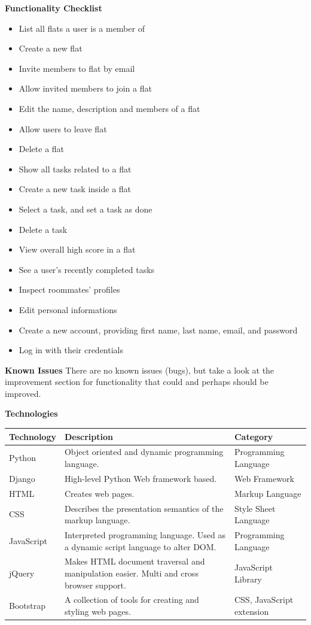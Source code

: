 \documentclass{sig-alt-release2}
\begin{document}
\textbf{Functionality Checklist}
\begin{itemize}
\item List all flats a user is a member of
\item Create a new flat
\item Invite members to flat by email
\item Allow invited members to join a flat 
\item Edit the name, description and members of a flat
\item Allow users to leave flat
\item Delete a flat
\item Show all tasks related to a flat
\item Create a new task inside a flat
\item Select a task, and set a task as done
\item Delete a task
\item View overall high score in a flat
\item See a user’s recently completed tasks
\item Inspect roommates{’} profiles
\item Edit personal informations
\item Create a new account, providing first name, last name, email, and password
\item Log in with their credentials
\end{itemize}

\textbf{Known Issues}
There are no known issues (bugs), but take a look at the improvement section for functionality that could and perhaps should be improved.

\textbf{Technologies}

\begin{center}
    \begin{tabular}{ | p{1.7cm} | p{3.5cm} | p{2cm} |}
    \hline
	 \textbf{Technology} & \textbf{Description} & \textbf{Category} \\ \hline
	
	Python & Object oriented and dynamic programming language. &	Programming Language \\ \hline
	Django & High-level Python Web framework based.&	Web Framework \\ \hline
	HTML & Creates web pages.	&Markup Language \\ \hline
	CSS	& Describes the presentation semantics of the markup language.&	Style Sheet Language \\ \hline
	JavaScript & Interpreted programming language. Used as a dynamic script language to alter DOM. & Programming Language \\ \hline
	jQuery & Makes HTML document traversal and manipulation easier. Multi and cross browser support. &	JavaScript Library \\ \hline
	Bootstrap & A collection of tools for creating and styling web pages. & CSS, JavaScript extension \\
	
    \hline
    \end{tabular}
\end{center}
\end{document}
